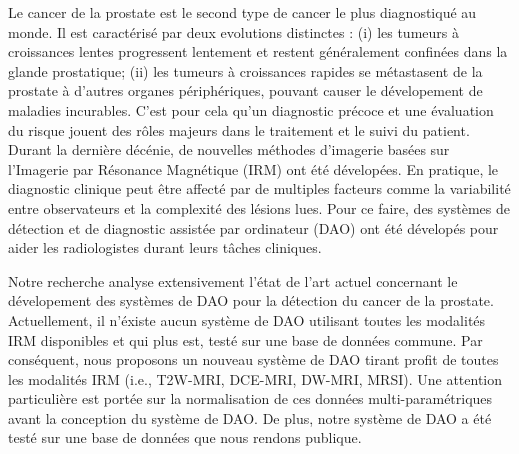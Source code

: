 \begin{abstractFrench}

Le cancer de la prostate est le second type de cancer le plus diagnostiqu\'e au monde.
Il est caract\'eris\'e par deux evolutions distinctes : (i) les tumeurs \`a croissances lentes progressent lentement et restent g\'en\'eralement confin\'ees dans la glande prostatique; (ii) les tumeurs \`a croissances rapides se m\'etastasent de la prostate \`a d'autres organes p\'eriph\'eriques, pouvant causer le d\'evelopement de maladies incurables.
C'est pour cela qu'un diagnostic pr\'ecoce et une \'evaluation du risque jouent des r\^oles majeurs dans le traitement et le suivi du patient.
Durant la derni\`ere d\'ec\'enie, de nouvelles m\'ethodes d'imagerie bas\'ees sur l'Imagerie par R\'esonance Magn\'etique (IRM) ont \'et\'e d\'evelop\'ees.
En pratique, le diagnostic clinique peut \^etre affect\'e par de multiples facteurs comme la variabilit\'e entre observateurs et la complexit\'e des l\'esions lues.
Pour ce faire, des syst\`emes de d\'etection et de diagnostic assist\'ee par ordinateur (DAO) ont \'et\'e d\'evelop\'es pour aider les radiologistes durant leurs t\^aches cliniques.

Notre recherche analyse extensivement l'\'etat de l'art actuel concernant le d\'evelopement des syst\`emes de DAO pour la d\'etection du cancer de la prostate.
Actuellement, il n'\'existe aucun syst\`eme de DAO utilisant toutes les modalit\'es IRM disponibles et qui plus est, test\'e sur une base de donn\'ees commune.
Par cons\'equent, nous proposons un nouveau syst\`eme de DAO tirant profit de toutes les modalit\'es IRM (i.e., T2W-MRI, DCE-MRI, DW-MRI, MRSI).
Une attention particuli\`ere est port\'ee sur la normalisation de ces donn\'ees multi-param\'etriques avant la conception du syst\`eme de DAO.
De plus, notre syst\`eme de DAO a \'et\'e test\'e sur une base de donn\'ees que nous rendons publique.

\end{abstractFrench}
